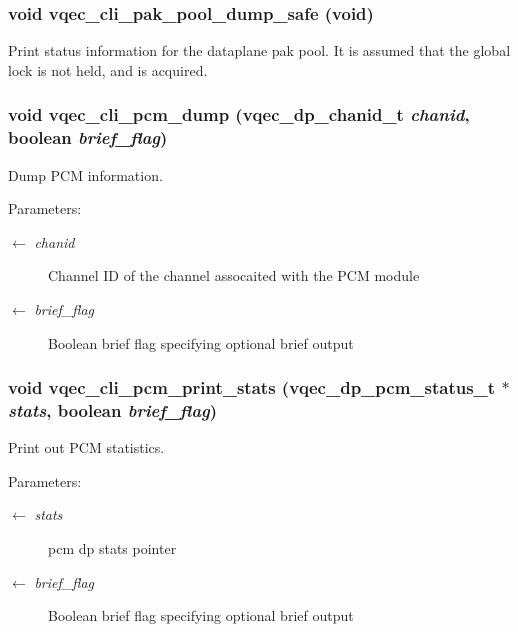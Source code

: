 \subsubsection{\setlength{\rightskip}{0pt plus 5cm}void vqec\_\-cli\_\-pak\_\-pool\_\-dump\_\-safe (void)}\label{vqec__cli__interface_8h_aa61e72da7a4578f372774dd56b0cdd2}


Print status information for the dataplane pak pool. It is assumed that the global lock is not held, and is acquired. 
\subsubsection{\setlength{\rightskip}{0pt plus 5cm}void vqec\_\-cli\_\-pcm\_\-dump (vqec\_\-dp\_\-chanid\_\-t {\em chanid}, boolean {\em brief\_\-flag})}\label{vqec__cli__interface_8h_6748be0200a306c1b2083a795b6e7a91}


Dump PCM information.

\begin{Desc}
\item[Parameters:]
\begin{description}
\item[\mbox{$\leftarrow$} {\em chanid}]Channel ID of the channel assocaited with the PCM module \item[\mbox{$\leftarrow$} {\em brief\_\-flag}]Boolean brief flag specifying optional brief output \end{description}
\end{Desc}
\subsubsection{\setlength{\rightskip}{0pt plus 5cm}void vqec\_\-cli\_\-pcm\_\-print\_\-stats (vqec\_\-dp\_\-pcm\_\-status\_\-t $\ast$ {\em stats}, boolean {\em brief\_\-flag})}\label{vqec__cli__interface_8h_00db3e3d93ee990978e268f395e901bb}


Print out PCM statistics.

\begin{Desc}
\item[Parameters:]
\begin{description}
\item[\mbox{$\leftarrow$} {\em stats}]pcm dp stats pointer \item[\mbox{$\leftarrow$} {\em brief\_\-flag}]Boolean brief flag specifying optional brief output \end{description}
\end{Desc}
